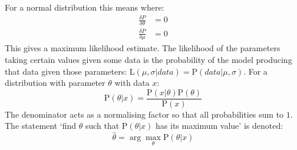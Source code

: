 For a normal distribution this means where:
\begin{align*}
    \frac{\delta P}{\delta \theta} & = 0 \\
    \frac{\delta P}{\delta \mu}    & = 0
\end{align*}
This gives a maximum likelihood estimate. The likelihood of the parameters taking certain values given some data is the probability of the model producing that data given those parameters: \(\mathrm{L}(\mu, \sigma | data) = \mathrm{P}(data | \mu, \sigma)\).
For a distribution with parameter \(\theta\) with data \(x\):
\begin{equation}
    \mathrm{P}(\theta | x) = \frac{\mathrm{P}(x | \theta)\mathrm{P}(\theta)}{\mathrm{P}(x)}
\end{equation}
The denominator acts as a normalising factor so that all probabilities sum to \(1\). The statement `find \(\theta\) such that \(\mathrm{P}(\theta|x)\) has its maximum value' is denoted:
\begin{equation*}
    \hat{\theta} = \arg \max_\theta \mathrm{P}(\theta|x)
\end{equation*}

